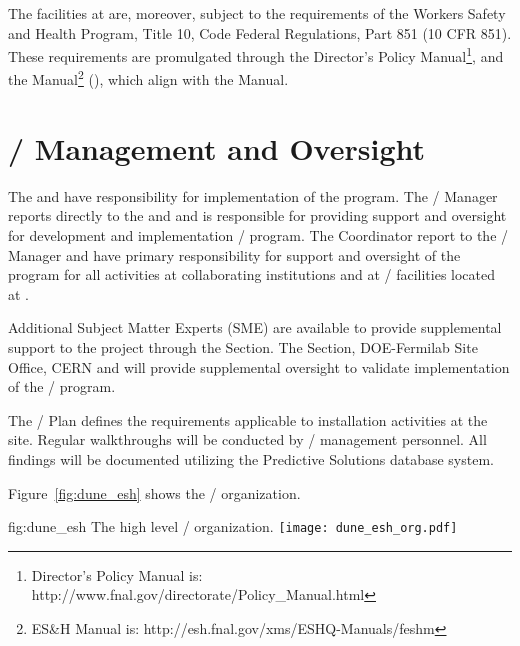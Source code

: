 The  facilities at  are, moreover, subject to
the requirements of the  Workers Safety and Health Program,
Title 10, Code Federal Regulations, Part 851 (10 CFR 851). These
requirements are promulgated through the \fnal Director's Policy
Manual\footnote{\fnal Director's Policy Manual is:
  http://www.fnal.gov/directorate/Policy\_Manual.html}, and the \fnal
{} Manual\footnote{\fnal ES\&H Manual is:
  http://esh.fnal.gov/xms/ESHQ-Manuals/feshm} (), which
align with the   Manual.


\section{/  Management and Oversight}

The  and  have responsibility for
implementation of the   program.  The
/  Manager reports directly to the
 and  and is responsible for providing
 support and oversight for development and implementation
/  program. The  
Coordinator report to the / 
Manager and have primary responsibility for  support and
oversight of the   program for all activities
at collaborating institutions and at /
facilities located at .

Additional  Subject Matter Experts (SME) are available to provide
supplemental support to the project through the \fnal {}
Section. The \fnal {} Section, DOE-Fermilab Site Office, CERN and
 will provide supplemental  oversight to validate
implementation of the /   program.

The /  Plan defines the 
requirements applicable to installation activities at the 
site. Regular  walkthroughs will be conducted by
/  management personnel. All
findings will be documented utilizing the \fnal Predictive Solutions
database system.

Figure~\ref{fig:dune_esh} shows the /  organization.
\begin{dunefigure}{fig:dune_esh}
  {The high level /  organization.}
  \texttt{[image: dune\_esh\_org.pdf]}
\end{dunefigure}




